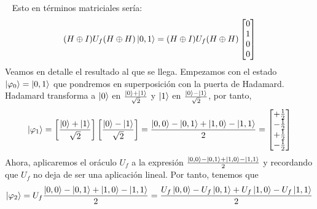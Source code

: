 \documentclass[a4paper]{article}
\numberwithin{equation}{section}
\begin{document}
\begin{figure}[h]
\centering
{}
\end{figure}\ \linebreak
Esto en términos matriciales sería:
\begin{equation}
(H\oplus I) U_f (H\oplus H) \ket{0, 1} = 
(H\oplus I) U_f (H\oplus H)
\begin{bmatrix}
0 \\ 1 \\ 0 \\ 0
\end{bmatrix}
\end{equation}
Veamos en detalle el resultado al que se llega. Empezamos con el estado $\ket{\varphi_0} = \ket{0, 1}$ que pondremos en superposición con la puerta de Hadamard.
Hadamard transforma a $\ket{0}$ en $\frac{\ket{0} + \ket{1}}{\sqrt{2}}$ y $\ket{1}$ en $\frac{\ket{0} - \ket{1}}{\sqrt{2}}$, por tanto,
\begin{equation}
\ket{\varphi_1} = \left[ \frac{\ket{0} + \ket{1}}{\sqrt{2}} \right] \left[ \frac{\ket{0} - \ket{1}}{\sqrt{2}} \right] =
\frac{\ket{0,0} - \ket{0,1} + \ket{1,0} - \ket{1,1}}{2} = 
\begin{bmatrix}
+\frac{1}{2} \\ -\frac{1}{2} \\ +\frac{1}{2} \\ -\frac{1}{2}
\end{bmatrix}
\end{equation}
Ahora, aplicaremos el oráculo $U_f$ a la expresión $\frac{\ket{0,0} - \ket{0,1} + \ket{1,0} - \ket{1,1}}{2}$ y recordando que $U_f$ no deja de ser una aplicación lineal. Por tanto, tenemos que
\begin{equation}
\ket{\varphi_2} = U_f \frac{\ket{0,0} - \ket{0,1} + \ket{1,0} - \ket{1,1}}{2} = \frac{U_f\ket{0,0} - U_f\ket{0,1} + U_f\ket{1,0} - U_f\ket{1,1}}{2} 
\end{equation}
\end{document}
